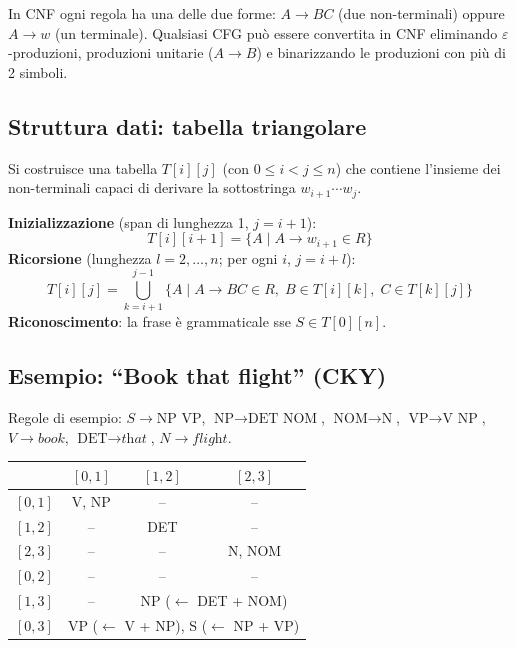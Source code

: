 \documentclass[12pt,a4paper]{article}
\begin{document}
In CNF ogni regola ha una delle due forme: $A \to BC$ (due non-terminali) oppure $A \to w$ (un terminale). Qualsiasi CFG può essere convertita in CNF eliminando $\varepsilon$-produzioni, produzioni unitarie ($A \to B$) e binarizzando le produzioni con più di 2 simboli.

\subsection{Struttura dati: tabella triangolare}

Si costruisce una tabella $T[i][j]$ (con $0 \le i < j \le n$) che contiene l'insieme dei non-terminali capaci di derivare la sottostringa $w_{i+1}\cdots w_j$.

\begin{defbox}
\textbf{Inizializzazione} (span di lunghezza 1, $j = i+1$):
\[
T[i][i{+}1] = \{A \mid A \to w_{i+1} \in R\}
\]
\textbf{Ricorsione} (lunghezza $l = 2,\dots,n$; per ogni $i$, $j=i+l$):
\[
T[i][j] = \bigcup_{k=i+1}^{j-1}\bigl\{A \mid A \to BC \in R,\; B \in T[i][k],\; C \in T[k][j]\bigr\}
\]
\textbf{Riconoscimento}: la frase è grammaticale sse $S \in T[0][n]$.
\end{defbox}

\subsection{Esempio: ``Book that flight'' (CKY)}

Regole di esempio: $S \to \text{NP VP}$, $\text{NP} \to \text{DET NOM}$, $\text{NOM} \to \text{N}$, $\text{VP} \to \text{V NP}$, $V \to \textit{book}$, $\text{DET} \to \textit{that}$, $N \to \textit{flight}$.

\begin{center}
\begin{tabular}{c|ccc}
  & $[0,1]$ & $[1,2]$ & $[2,3]$ \\
\hline
$[0,1]$ & V, NP & -- & -- \\
$[1,2]$ & -- & DET & -- \\
$[2,3]$ & -- & -- & N, NOM \\
\hline
$[0,2]$ & -- & -- & -- \\
$[1,3]$ & -- & \multicolumn{2}{c}{NP ($\leftarrow$ DET + NOM)} \\
\hline
$[0,3]$ & \multicolumn{3}{c}{VP ($\leftarrow$ V + NP), S ($\leftarrow$ NP + VP)} \\
\end{tabular}
\end{center}
\end{document}
